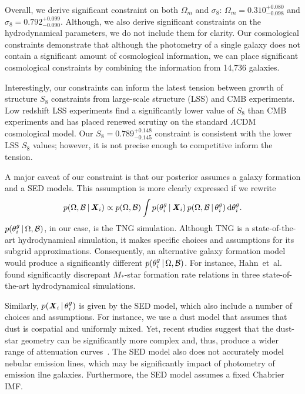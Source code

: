 Overall, we derive significant constraint on both $\Omega_m$ and $\sigma_8$: 
$\Omega_m = 0.310^{+0.080}_{-0.098}$ and $\sigma_8 = 0.792^{+0.099}_{-0.090}$. 
Although, we also derive significant constraints on the hydrodynamical
parameters, we do not include them for clarity.  
Our cosmological constraints demonstrate that although the photometry of a
single galaxy does not contain a significant amount of cosmological
information, we can place significant cosmological constraints by combining the
information from 14,736 galaxies. 

Interestingly, our constraints can inform the latest tension between growth of
structure $S_8$ constraints from large-scale structure (LSS) and CMB
experiments. 
Low redshift LSS experiments find a significantly lower value of $S_8$ than CMB
experiments and has placed renewed scrutiny on the standard
$\Lambda$CDM cosmological model.
Our $S_8 = 0.789^{+0.148}_{-0.145}$ constraint is consistent with the lower LSS
$S_8$ values; however, it is not precise enough to competitive inform the
tension. 

A major caveat of our constraint is that our posterior assumes a galaxy
formation and a SED models. 
This assumption is more clearly expressed if we rewrite 
\begin{equation}
    p(\Omega, \mathcal{B}\,|\, {\textbf{\textit{X}}_i}) \propto p(\Omega, \mathcal{B}) \int     p(\theta^g_i \,|\, {\textbf{\textit{X}}_i})\, p(\Omega, \mathcal{B}\,|\, \theta^g_i)\,
    {\rm d}\theta^g_i.
\end{equation}
$p(\theta^g_i\,|\,\Omega, \mathcal{B})$, in our case, is the TNG simulation. 
Although TNG is a state-of-the-art hydrodynamical simulation, it makes specific
choices and assumptions for its subgrid approximations. 
Consequently, an alternative galaxy formation model would produce a
significantly different $p(\theta^g_i\,|\,\Omega, \mathcal{B})$. 
For instance, Hahn~et~al.~ found significantly discrepant 
$M_*$-star formation rate relations in three state-of-the-art hydrodynamical
simulations.

Similarly, $p({\textbf{\textit{X}}_i}\,|\,\theta^g_i)$ is given by the SED model, which
also include a number of choices and assumptions. 
For instance, we use a dust model that assumes that dust is cospatial and
uniformly mixed. 
Yet, recent studies suggest that the dust-star geometry can be significantly
more complex and, thus, produce a wider range of attenuation
curves~\citep{narayanan2018a, hahn2021}. 
The SED model also does not accurately model nebular emission lines,
which may be significantly impact of photometry of emission ilne galaxies. 
Furthermore, the SED model assumes a fixed Chabrier IMF.  

